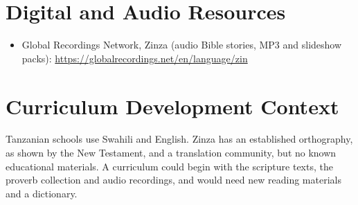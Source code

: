 \documentclass[12pt]{article}
\begin{document}
\section{Digital and Audio Resources}
\begin{itemize}
\item Global Recordings Network, Zinza (audio Bible stories, MP3 and slideshow packs): \url{https://globalrecordings.net/en/language/zin}
\end{itemize}

\section{Curriculum Development Context}
Tanzanian schools use Swahili and English. Zinza has an established orthography, as shown by the New Testament, and a translation community, but no known educational materials. A curriculum could begin with the scripture texts, the proverb collection and audio recordings, and would need new reading materials and a dictionary.
\end{document}
